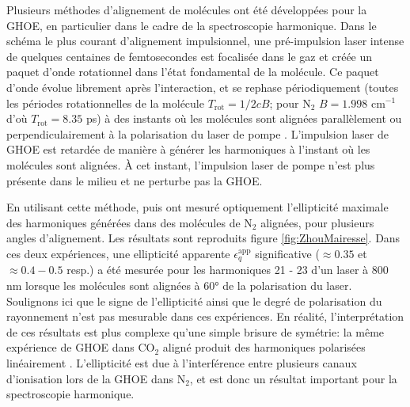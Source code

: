 Plusieurs méthodes d'alignement de molécules ont été développées pour la GHOE, en particulier dans le cadre de la spectroscopie harmonique. Dans le schéma le plus courant d'alignement impulsionnel, une pré-impulsion laser intense de quelques centaines de femtosecondes est focalisée dans le gaz et créée un paquet d'onde rotationnel dans l'état fondamental de la molécule. Ce paquet d'onde évolue librement après l'interaction, et se rephase périodiquement (toutes les périodes rotationnelles de la molécule $T_{\text{rot}} = 1/2cB$; pour N$_2$ $B = 1.998$ cm$^{-1}$ d'où $T_{\text{rot}} = 8.35$ ps) à des instants où les molécules sont alignées parallèlement ou perpendiculairement à la polarisation du laser de pompe . L'impulsion laser de GHOE est retardée de manière à générer les harmoniques à l'instant où les molécules sont alignées. \`{A} cet instant, l'impulsion laser de pompe n'est plus présente dans le milieu et ne perturbe pas la GHOE.

En utilisant cette méthode,  puis  ont mesuré optiquement l'ellipticité maximale des harmoniques générées dans des molécules de N$_2$ alignées, pour plusieurs angles d'alignement. Les résultats sont reproduits figure \ref{fig:ZhouMairesse}. Dans ces deux expériences, une ellipticité apparente $\epsilon_q^{\text{app}}$ significative ($\approx 0.35$ et $\approx 0.4 - 0.5$ resp.) a été mesurée pour les harmoniques 21 - 23 d'un laser à 800 nm lorsque les molécules sont alignées à 60° de la polarisation du laser. Soulignons ici que le signe de l'ellipticité ainsi que le degré de polarisation du rayonnement n'est pas mesurable dans ces expériences. En réalité, l'interprétation de ces résultats est plus complexe qu'une simple brisure de symétrie: la même expérience de GHOE dans CO$_2$ aligné produit des harmoniques polarisées linéairement . L'ellipticité est due à l'interférence entre plusieurs canaux d'ionisation lors de la GHOE dans N$_2$, et est donc un résultat important pour la spectroscopie harmonique.

